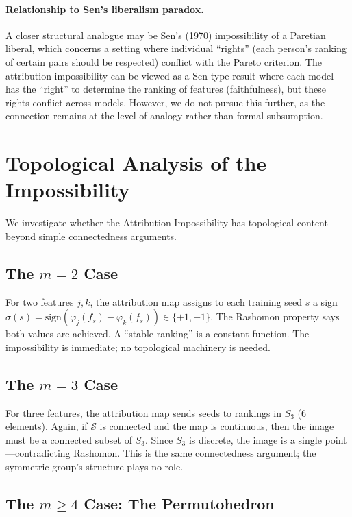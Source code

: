 \documentclass{article}
\begin{document}
\paragraph{Relationship to Sen's liberalism paradox.}
A closer structural analogue may be Sen's (1970) impossibility of a Paretian liberal, which concerns a setting where individual ``rights'' (each person's ranking of certain pairs should be respected) conflict with the Pareto criterion. The attribution impossibility can be viewed as a Sen-type result where each model has the ``right'' to determine the ranking of features (faithfulness), but these rights conflict across models. However, we do not pursue this further, as the connection remains at the level of analogy rather than formal subsumption.

\section{Topological Analysis of the Impossibility}
\label{sec:topological}

We investigate whether the Attribution Impossibility has topological content beyond simple connectedness arguments.

\subsection{The $m = 2$ Case}

For two features $j, k$, the attribution map assigns to each training seed $s$ a sign $\sigma(s) = \text{sign}(\varphi_j(f_s) - \varphi_k(f_s)) \in \{+1, -1\}$. The Rashomon property says both values are achieved. A ``stable ranking'' is a constant function. The impossibility is immediate; no topological machinery is needed.

\subsection{The $m = 3$ Case}

For three features, the attribution map sends seeds to rankings in $S_3$ (6 elements). Again, if $\mathcal{S}$ is connected and the map is continuous, then the image must be a connected subset of $S_3$. Since $S_3$ is discrete, the image is a single point---contradicting Rashomon. This is the same connectedness argument; the symmetric group's structure plays no role.

\subsection{The $m \geq 4$ Case: The Permutohedron}
\end{document}
